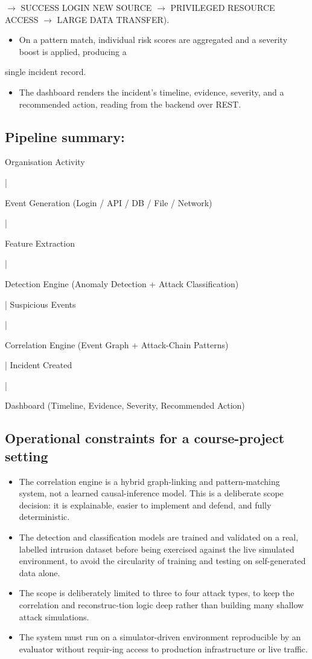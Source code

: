 \documentclass[12pt]{article}
\begin{document}
$\rightarrow$ SUCCESS LOGIN NEW SOURCE $\rightarrow$ PRIVILEGED RESOURCE ACCESS $\rightarrow$ LARGE DATA TRANSFER).

\begin{itemize}
  \item On a pattern match, individual risk scores are aggregated and a severity boost is applied, producing a
\end{itemize}

single incident record.

\begin{itemize}
  \item The dashboard renders the incident's timeline, evidence, severity, and a recommended action, reading from the backend over REST.
\end{itemize}

\subsection{Pipeline summary:}

Organisation Activity

|

Event Generation (Login / API / DB / File / Network)

|

Feature Extraction

|

Detection Engine (Anomaly Detection + Attack Classification)

| Suspicious Events

|

Correlation Engine (Event Graph + Attack-Chain Patterns)

| Incident Created

|

Dashboard (Timeline, Evidence, Severity, Recommended Action)

\subsection{Operational constraints for a course-project setting}

\begin{itemize}
  \item The correlation engine is a hybrid graph-linking and pattern-matching system, not a learned causal-inference model. This is a deliberate scope decision: it is explainable, easier to implement and defend, and fully deterministic.
  \item The detection and classification models are trained and validated on a real, labelled intrusion dataset before being exercised against the live simulated environment, to avoid the circularity of training and testing on self-generated data alone.
  \item The scope is deliberately limited to three to four attack types, to keep the correlation and reconstruc-tion logic deep rather than building many shallow attack simulations.
  \item The system must run on a simulator-driven environment reproducible by an evaluator without requir-ing access to production infrastructure or live traffic.
\end{itemize}
\end{document}
